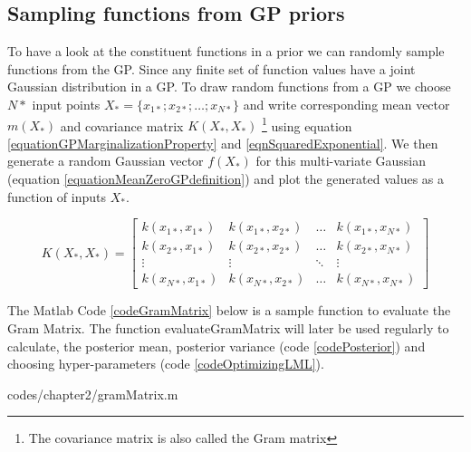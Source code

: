 \subsection{Sampling functions from GP priors}\label{subSecSamplingFunctionsGPPrior}
To have a look at the constituent functions in a prior we can randomly sample functions from the GP. Since any finite set of function values have a joint Gaussian distribution in a GP. To draw random functions from a GP we choose $N*$ input points $X_{*} = \{x_{1*}; x_{2*}; \ldots ; x_{N*}\}$ and write corresponding mean vector $m(X_{*})$ and covariance matrix $K(X_{*}, X_{*} )$ \footnote{The covariance matrix is also called the Gram matrix} using equation \ref{equationGPMarginalizationProperty} and \ref{eqnSquaredExponential}. We then generate a random Gaussian vector $f(X_{*})$ for this multi-variate Gaussian (equation \ref{equationMeanZeroGPdefinition}) and plot the generated values as a function of inputs $X_{*}$. 

\begin{equation}\label{eqnCovMatrixSquaredExponential}
K(X_{*}, X_{*} ) = \left [ \begin{matrix}
k(x_{1*}, x_{1*}) & k(x_{1*}, x_{2*}) & \ldots & k(x_{1*}, x_{N*})
\\ k(x_{2*}, x_{1*}) & k(x_{2*}, x_{2*}) & \ldots & k(x_{2*}, x_{N*})
\\ \vdots & \vdots & \ddots & \vdots
\\ k(x_{N*}, x_{1*}) & k(x_{N*}, x_{2*}) & \ldots & k(x_{N*}, x_{N*})
\end{matrix} \right ] 
\end{equation}

The Matlab Code \ref{codeGramMatrix} below is a sample function to evaluate the Gram Matrix. The function  evaluateGramMatrix will later be used regularly to calculate, the posterior mean, posterior variance (code \ref{codePosterior}) and choosing hyper-parameters (code \ref{codeOptimizingLML}). 


\begin{mdframed}[hidealllines=true,backgroundcolor=lightgray!20]

                    {codes/chapter2/gramMatrix.m}
\end{mdframed}

